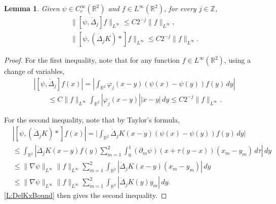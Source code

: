 \documentclass[11pt,reqno,xcolor=svgnames]{amsart}
\def\R{{\mathbb R}}
\def\Z{{\mathbb Z}}
\theoremstyle{plain}
\newtheorem{lemma}[theorem]{Lemma}
\theoremstyle{definition}
\theoremstyle{plain}
\theoremstyle{remark}
\newcommand{\abs}[1]{\left\vert#1\right\vert}
\begin{document}
\begin{lemma}\label{LPRieszcommutator}
Given $\psi\in C^{\infty}_c(\R^2)$ and $f\in L^{\infty}(\R^2)$, for every $j\in \Z$,
\begin{equation*}
\begin{split}
&\|[\psi, {\dot{\Delta}}_j] f\|_{L^{\infty}} \leq C2^{-j} \|f\|_{L^{\infty}},\\
&\|[\psi, ({\dot{\Delta}}_jK)\ast] f\|_{L^{\infty}} \leq C2^{-j} \|f\|_{L^{\infty}}.
\end{split}
\end{equation*}
\end{lemma}
\begin{proof}
For the first inequality, note that for any function $f\in L^{\infty}(\R^2)$, using a change of variables,
\begin{equation}\label{term2}
\begin{split}
&\abs{ [\psi, \dot{\Delta}_j] f(x) }= \abs{ \int_{\R^2} \varphi_j (x-y)(\psi(x) - \psi(y))f(y) \, dy }\\
&\qquad \leq C\|f \|_{L^{\infty}}\int_{\R^2} |\varphi_j (x-y)||x-y| \, dy \leq C2^{-j}\|f\|_{L^{\infty}}. 
\end{split}
\end{equation}

For the second inequality, note that by Taylor's formula, 
\begin{equation}\label{IIIest}
\begin{split}
&|[\psi, (\dot{\Delta}_jK)\ast] f(x)| = \bigg| \int_{\R^2} {\dot{\Delta}}_j K(x-y)(\psi(x) - \psi(y)) f(y) \, dy \bigg|  \\
&\leq  \int_{\R^2}\abs{{\dot{\Delta}}_jK(x-y)f(y) \sum_{m=1}^2 \int_0^1 (\partial_m \psi) (x+ \tau(y-x))(x_m - y_m) \, d\tau } \, dy\\
&\leq \|\nabla\psi\|_{L^{\infty}} \| f \|_{L^{\infty}} \sum_{m=1}^2\int_{\R^2} \abs{{\dot{\Delta}}_jK(x-y)(x_m-y_m)} \, dy\\
&\leq \|\nabla\psi\|_{L^{\infty}} \| f \|_{L^{\infty}}\sum_{m=1}^2 \int_{\R^2} \abs{{\dot{\Delta}}_jK(y)y_m} \, dy.
\end{split}
\end{equation}
\cref{L:DelKxBound} then gives the second inequality.
\end{proof}
\end{document}
